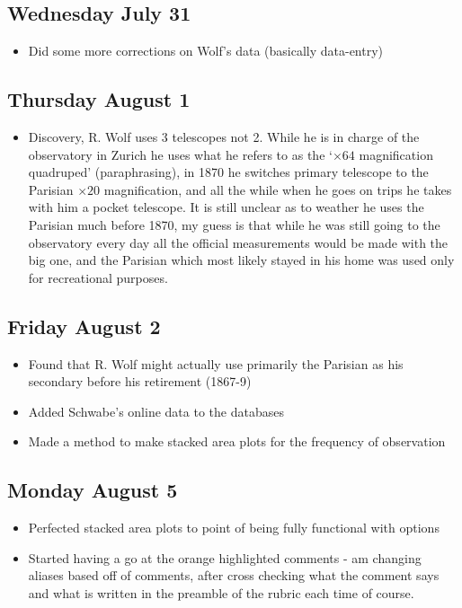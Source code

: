 \documentclass[12pt]{article}
\begin{document}
\subsection{Wednesday July 31}
\begin{itemize}
    \item Did some more corrections on Wolf's data (basically data-entry)
\end{itemize}

\subsection{Thursday August 1}
\begin{itemize}
    \item Discovery, R. Wolf uses 3 telescopes not 2. While he is in charge of the observatory in Zurich he uses what he refers to as the `$\times 64$ magnification quadruped' (paraphrasing), in 1870 he switches primary telescope to the Parisian $\times 20$ magnification, and all the while when he goes on trips he takes with him a pocket telescope. It is still unclear as to weather he uses the Parisian much before 1870, my guess is that while he was still going to the observatory every day all the official measurements would be made with the big one, and the Parisian which most likely stayed in his home was used only for recreational purposes.
\end{itemize}

\subsection{Friday August 2}
\begin{itemize}
    \item Found that R. Wolf might actually use primarily the Parisian as his secondary before his retirement (1867-9)
    \item Added Schwabe's online data to the databases
    \item Made a method to make stacked area plots for the frequency of observation
\end{itemize}

\subsection{Monday August 5}
\begin{itemize}
    \item Perfected stacked area plots to point of being fully functional with options
    \item Started having a go at the orange highlighted comments - am changing aliases based off of comments, after cross checking what the comment says and what is written in the preamble of the rubric each time of course.
\end{itemize}
\end{document}
